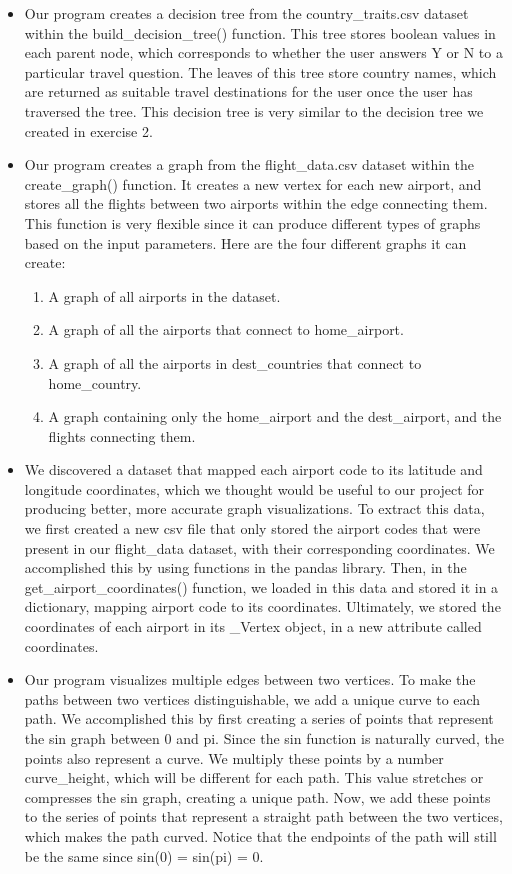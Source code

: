 \documentclass[11pt]{article}
\begin{document}
\begin{itemize}
    \item Our program creates a decision tree from the country\_traits.csv dataset within the build\_decision\_tree() function. This tree stores boolean values in each parent node, which corresponds to whether the user answers Y or N to a particular travel question. The leaves of this tree store country names, which are returned as suitable travel destinations for the user once the user has traversed the tree. This decision tree is very similar to the decision tree we created in exercise 2. 
    
    \item Our program creates a graph from the flight\_data.csv dataset within the create\_graph() function. It creates a new vertex for each new airport, and stores all the flights between two airports within the edge connecting them. This function is very flexible since it can produce different types of graphs based on the input parameters. Here are the four different graphs it can create:
        \begin{enumerate}
            \item A graph of all airports in the dataset.
            \item A graph of all the airports that connect to home\_airport.
            \item A graph of all the airports in dest\_countries that connect to home\_country.
            \item A graph containing only the home\_airport and the dest\_airport, and the flights connecting them.
        \end{enumerate}
    
    \item We discovered a dataset that mapped each airport code to its latitude and longitude coordinates, which we thought would be useful to our project for producing better, more accurate graph visualizations. To extract this data, we first created a new csv file that only stored the airport codes that were present in our flight\_data dataset, with their corresponding coordinates. We accomplished this by using functions in the pandas library. Then, in the get\_airport\_coordinates() function, we loaded in this data and stored it in a dictionary, mapping airport code to its coordinates. Ultimately, we stored the coordinates of each airport in its \_Vertex object, in a new attribute called coordinates.
    
    \item Our program visualizes multiple edges between two vertices. To make the paths between two vertices distinguishable, we add a unique curve to each path. We accomplished this by first creating a series of points that represent the sin graph between 0 and pi. Since the sin function is naturally curved, the points also represent a curve. We multiply these points by a number curve\_height, which will be different for each path. This value stretches or compresses the sin graph, creating a unique path. Now, we add these points to the series of points that represent a straight path between the two vertices, which makes the path curved. Notice that the endpoints of the path will still be the same since sin(0) = sin(pi) = 0.
    

\end{itemize}
\end{document}
